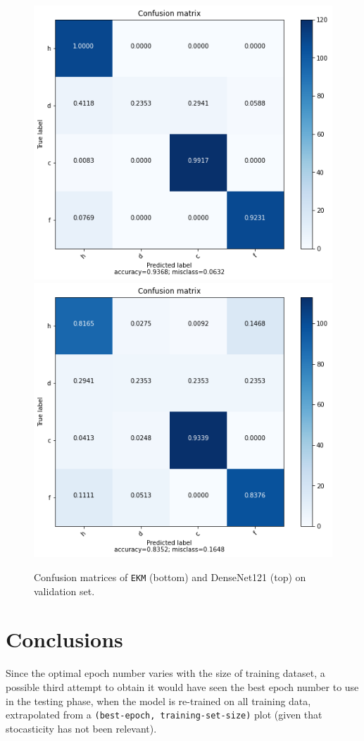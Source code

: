 \documentclass[aps,twocolumn,secnumarabic,nobalancelastpage,amsmath,amssymb,
nofootinbib]{revtex4}
\begin{document}
\begin{figure}[h]
	\centering
	\includegraphics[width=0.7\linewidth]{Images/ConfusionMatrixDenseNet121}
	\includegraphics[width=0.7\linewidth]{Images/ConfusionMatrixEKM}
	\caption{Confusion matrices of \texttt{EKM} (bottom) and DenseNet121 (top) on validation set.}
	\label{fig:confusionmatrixdensenet121}
\end{figure}


\section{Conclusions}\label{conclusions}

Since the optimal epoch number varies with the size of training dataset,
a possible third attempt to obtain it would have seen the best epoch
number to use in the testing phase, when the model is re-trained on all
training data, extrapolated from a \texttt{(best-epoch,\ training-set-size)} plot (given that stocasticity has not been relevant). 
\end{document}
